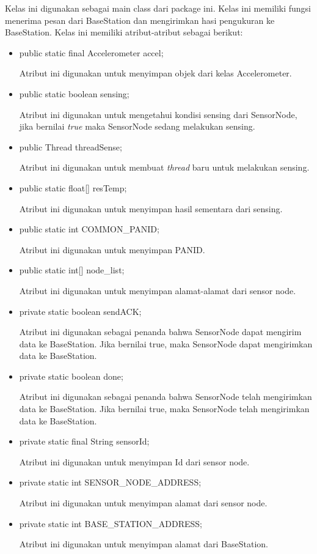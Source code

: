 Kelas ini digunakan sebagai main class dari package ini. Kelas ini memiliki fungsi menerima pesan dari BaseStation dan mengirimkan hasi pengukuran ke BaseStation. Kelas ini memiliki atribut-atribut sebagai berikut:
\begin{itemize}
    \item public static final Accelerometer accel; 
    
    Atribut ini digunakan untuk menyimpan objek dari kelas Accelerometer.
    
    \item public static boolean sensing;
    
    Atribut ini digunakan untuk mengetahui kondisi sensing dari SensorNode, jika bernilai \textit{true} maka SensorNode sedang melakukan sensing.
    
    \item public Thread threadSense;
    
    Atribut ini digunakan untuk membuat \textit{thread} baru untuk melakukan sensing.
    
    \item public static float[] resTemp;
    
    Atribut ini digunakan untuk menyimpan hasil sementara dari sensing.
    
    \item public static int COMMON\_PANID;
    
    Atribut ini digunakan untuk menyimpan PANID.
    
    \item public static int[] node\_list;
    
    Atribut ini digunakan untuk menyimpan alamat-alamat dari sensor node.
    
    \item private static boolean sendACK;
    
    Atribut ini digunakan sebagai penanda bahwa SensorNode dapat mengirim data ke BaseStation. Jika bernilai true, maka SensorNode dapat mengirimkan data ke BaseStation.
    
    \item private static boolean done;
    
    Atribut ini digunakan sebagai penanda bahwa SensorNode telah mengirimkan data ke BaseStation. Jika bernilai true, maka SensorNode telah mengirimkan data ke BaseStation.
    
    \item private static final String sensorId;
    
    Atribut ini digunakan untuk menyimpan Id dari sensor node.
    
    \item private static int SENSOR\_NODE\_ADDRESS;
    
    Atribut ini digunakan untuk menyimpan alamat dari sensor node.
    
    \item private static int BASE\_STATION\_ADDRESS;
    
    Atribut ini digunakan untuk menyimpan alamat dari BaseStation.
\end{itemize}

